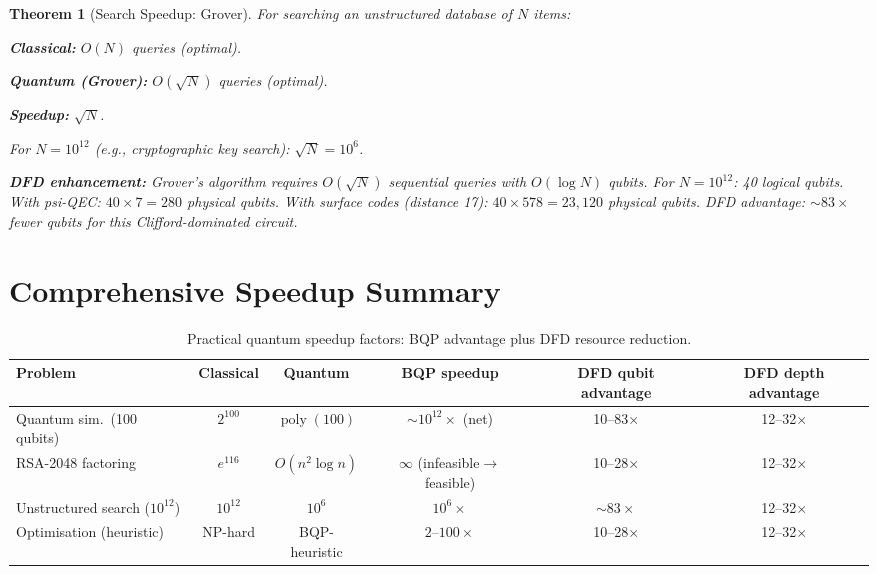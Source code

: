 \documentclass[11pt]{article}
\newtheorem{theorem}{Theorem}[section]
\theoremstyle{definition}
\theoremstyle{remark}
\DeclareMathOperator{\poly}{poly}
\begin{document}
\begin{theorem}[Search Speedup: Grover]
\label{thm:search-speedup}
For searching an unstructured database of $N$ items:

\textbf{Classical:} $O(N)$ queries (optimal).

\textbf{Quantum (Grover):} $O(\sqrt{N})$ queries (optimal).

\textbf{Speedup:} $\sqrt{N}$.

For $N = 10^{12}$ (e.g., cryptographic key search):
$\sqrt{N} = 10^6$.

\textbf{DFD enhancement:} Grover's algorithm requires $O(\sqrt{N})$
sequential queries with $O(\log N)$ qubits. For $N = 10^{12}$:
40 logical qubits. With psi-QEC: $40 \times 7 = 280$ physical qubits.
With surface codes (distance 17): $40 \times 578 = 23{,}120$
physical qubits. DFD advantage: $\sim 83\times$ fewer qubits
for this Clifford-dominated circuit.
\end{theorem}

\section{Comprehensive Speedup Summary}
\label{sec:speedup-summary}

\begin{table}[h]
\centering
\caption{Practical quantum speedup factors: BQP advantage plus DFD
  resource reduction.}
\label{tab:speedup-summary}
\begin{tabular}{@{}p{2.5cm}ccccc@{}}
\toprule
Problem & Classical & Quantum & BQP speedup & DFD qubit advantage &
  DFD depth advantage \\
\midrule
Quantum sim.\ (100 qubits) & $2^{100}$ & $\poly(100)$ &
  $\sim 10^{12}\times$ (net) & 10--83$\times$ & 12--32$\times$ \\
\addlinespace
RSA-2048 factoring & $e^{116}$ & $O(n^2 \log n)$ &
  $\infty$ (infeasible$\to$feasible) & 10--28$\times$ & 12--32$\times$ \\
\addlinespace
Unstructured search ($10^{12}$) & $10^{12}$ & $10^6$ &
  $10^6\times$ & $\sim 83\times$ & 12--32$\times$ \\
\addlinespace
Optimisation (heuristic) & NP-hard & BQP-heuristic &
  $2$--$100\times$ & 10--28$\times$ & 12--32$\times$ \\
\bottomrule
\end{tabular}
\end{table}
\end{document}

